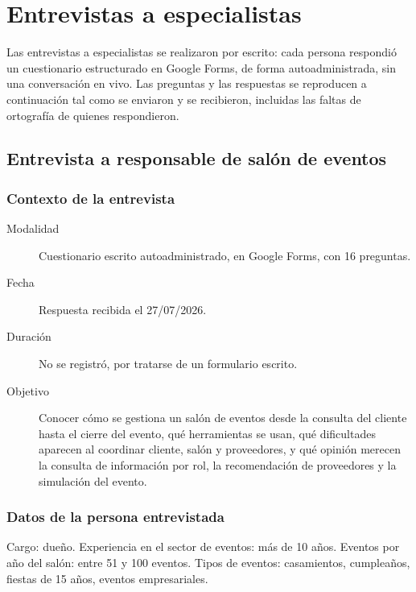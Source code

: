 
\chapter{Entrevistas a especialistas}\label{apx:entrevista}

Las entrevistas a especialistas se realizaron por escrito: cada persona
respondió un cuestionario estructurado en Google Forms, de forma
autoadministrada, sin una conversación en vivo. Las preguntas y las
respuestas se reproducen a continuación tal como se enviaron y se
recibieron, incluidas las faltas de ortografía de quienes respondieron.

\section{Entrevista a responsable de salón de eventos}

\subsection{Contexto de la entrevista}

\begin{description}
    \item[Modalidad] Cuestionario escrito autoadministrado, en Google Forms, con 16 preguntas.
    \item[Fecha] Respuesta recibida el 27/07/2026.
    \item[Duración] No se registró, por tratarse de un formulario escrito.
    \item[Objetivo] Conocer cómo se gestiona un salón de eventos desde la consulta del cliente hasta el cierre del evento, qué herramientas se usan, qué dificultades aparecen al coordinar cliente, salón y proveedores, y qué opinión merecen la consulta de información por rol, la recomendación de proveedores y la simulación del evento.
\end{description}

\subsection{Datos de la persona entrevistada}

Cargo: dueño. Experiencia en el sector de eventos: más de 10 años. Eventos por año del salón: entre 51 y 100 eventos. Tipos de eventos: casamientos, cumpleaños, fiestas de 15 años, eventos empresariales.

